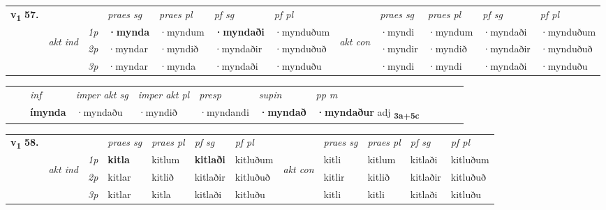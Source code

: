 \begin{tabular}{llllllllllll} \toprule
\multirow{4}{*}{{{\textbf{v{\textsubscript{1}}} \Large{\textbf{57.}}}}}  & &   &  \textit{praes sg}  & \textit{praes pl}  &\textit{ pf sg} & \textit{pf pl} &  &  \textit{praes sg}  & \textit{praes pl}  & \textit{pf sg} & \textit{pf pl } \\*
	\cmidrule{4-7} \cmidrule{9-12}
 & \multirow{3}{*}{\begin{turn}{90}\textit{akt ind}\end{turn}} & {\textit{1p}} & \textbf{·mynda} & ·myndum    & \textbf{·myndaði} & ·mynduðum & \multirow{3}{*}{\begin{turn}{90}\textit{akt con}\end{turn}} &·myndi & ·myndum & ·myndaði & ·mynduðum\\*
& &  {\textit{2p}} &  ·myndar  & ·myndið   & ·myndaðir & ·mynduðuð & & ·myndir & ·myndið & ·myndaðir & ·mynduðuð \\*
& &  {\textit{3p}} & ·myndar & ·mynda   & ·myndaði & ·mynduðu & & ·myndi & ·myndi& ·myndaði & ·mynduðu  \\*
\cmidrule{4-7} \cmidrule{9-12}
\end{tabular}


\begin{tabular}{llllllllllll}
 & & \textit{inf} & \textit{imper akt sg} & \textit{imper akt pl}   & \textit{presp} & \textit{supin}  & \textit{pp m}     \\*
  & & \textbf{ímynda} & ·myndaðu  & ·myndið   & ·myndandi &  \textbf{·myndað}  & \textbf{·myndaður} adj \textbf{\textsubscript{3a+5c}} \\*
\cmidrule{1-12}
\end{tabular}



\begin{tabular}{llllllllllll} \toprule
\multirow{4}{*}{{{\textbf{v{\textsubscript{1}}} \Large{\textbf{58.}}}}}  & &   &  \textit{praes sg}  & \textit{praes pl}  &\textit{ pf sg} & \textit{pf pl} &  &  \textit{praes sg}  & \textit{praes pl}  & \textit{pf sg} & \textit{pf pl } \\*
	\cmidrule{4-7} \cmidrule{9-12}
 & \multirow{3}{*}{\begin{turn}{90}\textit{akt ind}\end{turn}} & {\textit{1p}} & \textbf{kitla} & kitlum    & \textbf{kitlaði} & kitluðum & \multirow{3}{*}{\begin{turn}{90}\textit{akt con}\end{turn}} &kitli & kitlum & kitlaði & kitluðum\\*
& &  {\textit{2p}} &  kitlar  & kitlið   & kitlaðir & kitluðuð & & kitlir & kitlið & kitlaðir & kitluðuð \\*
& &  {\textit{3p}} & kitlar & kitla   & kitlaði & kitluðu & & kitli & kitli& kitlaði & kitluðu  \\*
\cmidrule{4-7} \cmidrule{9-12}
\end{tabular}


